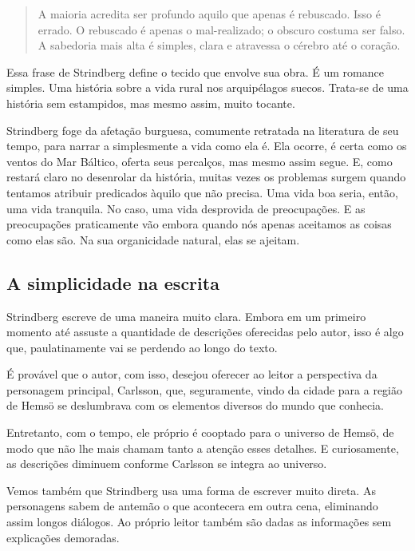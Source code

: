 \documentclass[12pt]{extarticle}
\begin{document}
\begin{quote}
A maioria acredita ser profundo aquilo que apenas é rebuscado. Isso é
errado. O rebuscado é apenas o mal-realizado; o obscuro costuma ser
falso. A sabedoria mais alta é simples, clara e atravessa o cérebro até
o coração.
\end{quote}

Essa frase de Strindberg define o tecido que envolve sua obra. É um
romance simples. Uma história sobre a vida rural nos arquipélagos
suecos. Trata-se de uma história sem estampidos, mas mesmo assim, muito
tocante.




Strindberg foge da afetação burguesa, comumente retratada na literatura
de seu tempo, para narrar a simplesmente a vida como ela é. Ela ocorre,
é certa como os ventos do Mar Báltico, oferta seus percalços, mas mesmo
assim segue. E, como restará claro no desenrolar da história, muitas
vezes os problemas surgem quando tentamos atribuir predicados àquilo que
não precisa. Uma vida boa seria, então, uma vida tranquila. No caso, uma
vida desprovida de preocupações. E as preocupações praticamente vão
embora quando nós apenas aceitamos as coisas como elas são. Na sua
organicidade natural, elas se ajeitam.




\subsection{A simplicidade na escrita}

Strindberg escreve de uma maneira muito clara. Embora em um primeiro
momento até assuste a quantidade de descrições oferecidas pelo autor,
isso é algo que, paulatinamente vai se perdendo ao longo do texto.

É provável que o autor, com isso, desejou oferecer ao leitor a
perspectiva da personagem principal, Carlsson, que, seguramente, vindo
da cidade para a região de Hemsö se deslumbrava com os elementos
diversos do mundo que conhecia.

Entretanto, com o tempo, ele próprio é cooptado para o universo de
Hemsö, de modo que não lhe mais chamam tanto a atenção esses detalhes. E
curiosamente, as descrições diminuem conforme Carlsson se integra ao
universo.

Vemos também que Strindberg usa uma forma de escrever muito direta. As
personagens sabem de antemão o que acontecera em outra cena, eliminando
assim longos diálogos. Ao próprio leitor também são dadas as informações
sem explicações demoradas.
\end{document}
